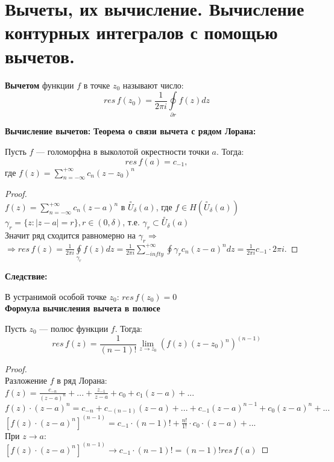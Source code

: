 \newpage
\section{Вычеты, их вычисление. Вычисление контурных интегралов с помощью вычетов.}

\textbf{Вычетом} функции $f$ в точке $z_0$ называют число:
$$res\, f(z_0) = \frac{1}{2\pi i} \oint\limits_{\partial r}f(z)dz$$

\textbf{Вычисление вычетов:}
\textbf{Теорема о связи вычета с рядом Лорана:}

Пусть $f$ --- голоморфна в выколотой окрестности точки $a$. Тогда:
$$
res\, f(a) = c_{-1},
$$
где $f(z) = \sum_{n=-\infty}^{+\infty}c_n (z-z_0)^n$
\\

\begin{proof}
    \ \\
    $f(z)=\sum_{n=-\infty}^{+\infty}c_n(z-a)^n$ в $\overset{\circ}{U}_{\delta}(a)$, где $f\in H(\overset{\circ}{U}_{\delta}(a))$\\
    $\gamma_r=\{z: |z-a|=r\}, r\in (0, \delta)$, т.е. $\gamma_r \subset \overset{\circ}{U}_{\delta}(a)$\\
    Значит ряд сходится равномерно на $\gamma_r \Rightarrow $\\
    $\Rightarrow res\,f(z)=\frac{1}{2\pi i}\oint\limits_{\gamma_r}f(z)dz=\frac{1}{2\pi i}\sum_{-infty}^{+\infty}\oint\limits{\gamma_r} c_n(z-a)^ndz=\frac{1}{2\pi i}c_{-1}\cdot 2\pi i$.
\end{proof}


\textbf{Следствие:}

В устранимой особой точке $z_0$: $res\, f(z_0) = 0$
\\

\textbf{Формула вычисления вычета в полюсе}

Пусть $z_0$ --- полюс функции $f$. Тогда:
$$
res\, f(z) = \frac{1}{(n-1)!} \underset{z \rightarrow z_0}{\lim} \left(f(z)(z-z_0)^n\right)^{(n-1)}
$$

\begin{proof}
    \ \\
    Разложение $f$ в ряд Лорана:\\
    $f(z)=\frac{c_{-n}}{(z-a)^n}+...+\frac{z_{-1}}{z-a}+c_0+c_1(z-a)+...$\\
    $f(z)\cdot (z-a)^n=c_{-n}+c_{-(n-1)}(z-a)+...+c_{-1}(z-a)^{n-1}+c_0(z-a)^n+...$\\
    $\left[f(z)\cdot (z-a)^n\right]^{(n-1)}=c_{-1}\cdot (n-1)!+\frac{n!}{1!}\cdot c_0\cdot (z-a)+...$\\
    При  $z\to a: $\\
    $\left[f(z)\cdot (z-a)^n\right]^{(n-1)}\rightarrow c_{-1}\cdot (n-1)! = (n-1)!res\,f(a)$
\end{proof}

